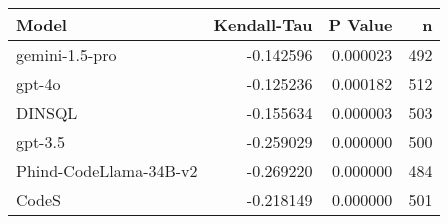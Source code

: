 \begin{tabular}{lrrr}
\toprule
Model & Kendall-Tau & P Value & n \\
\midrule
gemini-1.5-pro & -0.142596 & 0.000023 & 492 \\
gpt-4o & -0.125236 & 0.000182 & 512 \\
DINSQL & -0.155634 & 0.000003 & 503 \\
gpt-3.5 & -0.259029 & 0.000000 & 500 \\
Phind-CodeLlama-34B-v2 & -0.269220 & 0.000000 & 484 \\
CodeS & -0.218149 & 0.000000 & 501 \\
\bottomrule
\end{tabular}
